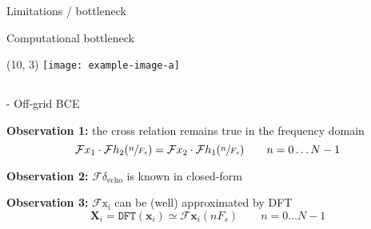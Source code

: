 \begin{frame}{Limitations / bottleneck}
\begin{block}{Computational bottleneck}
    \end{block}


    \begin{textblock}{5}(10, 3)
        \texttt{[image: example-image-a]}
    \end{textblock}

\end{frame}

\subsection{\blaster}

\begin{frame}{\blaster - Off-grid BCE}
    \begin{block}{\textbf{Observation 1:} the cross relation remains true in the frequency domain}
        \begin{equation*}
            \mathcal{F}x_1 \cdot \mathcal{F}h_2 (\sfrac{n}{F_s}) = \mathcal{F}x_2 \cdot \mathcal{F}h_1(\sfrac{n}{F_s}) \qquad n=0\dots N-1
        \end{equation*}
        \end{block}

        \vspace{.5em}

        \begin{block}{\textbf{Observation 2:} $\mathcal{F}\delta_{\mathrm{echo}}$ is known in closed-form}
        \end{block}

        \vspace{1.em}

        \begin{block}{\textbf{Observation 3:} $\mathcal{F}{\mathrm{x_i}}$ can be (well) approximated by DFT}
        \begin{equation*}
            \mathbf{X}_i = \texttt{DFT}(\mathbf{x}_i) \simeq  \mathcal{F}{\mathbf{x}_i}(nF_s) \qquad n=0\dots N-1
        \end{equation*}
        \end{block}




\end{frame}
